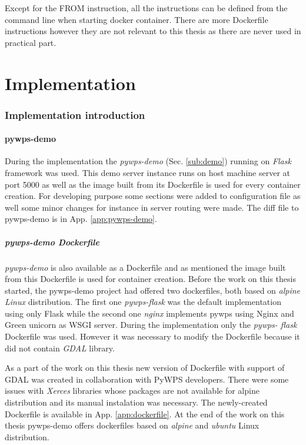 \documentclass[12pt,a4paper]{article}
\begin{document}
Except for the FROM instruction, all the instructions can be defined from the command line when starting docker container. There are more Dockerfile instructions however they are not relevant to this thesis as there are never used in practical part.

\newpage
\part{Implementation}

\newpage
\section{Implementation introduction}
\subsection{pywps-demo}
During the implementation the \textit{pywps-demo} (Sec. \ref{sub:demo}) running on \textit{Flask} framework was used. This demo server instance 
runs on host machine server at port 5000 as well as the image built from its Dockerfile is used for every container creation. For developing 
purpose some sections were added to configuration file as well some minor changes for instance in server routing were made. The diff 
file to pywps-demo is in App. \ref{app:pywps-demo}.

\subsubsection{pywps-demo Dockerfile}
\textit{pywps-demo} is also available as a Dockerfile and as mentioned the image built from this Dockerfile is used for container creation. 
Before the work on this thesis started, the pywps-demo project had offered two dockerfiles, 
both  based on \textit{alpine Linux} distribution. The first one \textit{pywps-flask} was the default implementation using only Flask while the 
second one \textit{nginx} implements pywps using Nginx and Green unicorn as WSGI server. During the implementation only the \textit{pywps-
flask} Dockerfile was used. However it was necessary to modify the Dockerfile because it did not contain \textit{GDAL} library. 

As a part of the work on this thesis new version of Dockerfile with support of GDAL was created in collaboration with PyWPS developers. There 
were some issues with \textit{Xerces} libraries whose packages are not available for alpine distribution and its manual
instalation was necessary. The newly-created Dockerfile is available in App. \ref{app:dockerfile}. At the end of the work on this thesis pywps-demo offers dockerfiles based on \textit{alpine} and \textit{ubuntu} Linux distribution.
\end{document}
